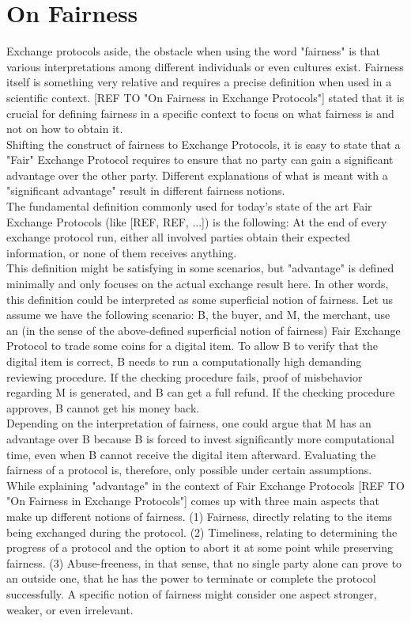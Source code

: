 \documentclass{cacthesis}
\begin{document}
		\section{On Fairness}
		Exchange protocols aside, the obstacle when using the word "fairness" is that various interpretations among different individuals or even cultures exist. Fairness itself is something very relative and requires a precise definition when used in a scientific context. [REF TO "On Fairness in Exchange Protocols"] stated that it is crucial for defining fairness in a specific context to focus on what fairness is and not on how to obtain it. \\
        Shifting the construct of fairness to Exchange Protocols, it is easy to state that a "Fair" Exchange Protocol requires to ensure that no party can gain a significant advantage over the other party. Different explanations of what is meant with a "significant advantage" result in different fairness notions. \\
        The fundamental definition commonly used for today's state of the art Fair Exchange Protocols (like [REF, REF, ...]) is the following: At the end of every exchange protocol run, either all involved parties obtain their expected information, or none of them receives anything. \\
        This definition might be satisfying in some scenarios, but "advantage" is defined minimally and only focuses on the actual exchange result here. In other words, this definition could be interpreted as some superficial notion of fairness. Let us assume we have the following scenario: B, the buyer, and M, the merchant, use an (in the sense of the above-defined superficial notion of fairness) Fair Exchange Protocol to trade some coins for a digital item. To allow B to verify that the digital item is correct, B needs to run a computationally high demanding reviewing procedure. If the checking procedure fails, proof of misbehavior regarding M is generated, and B can get a full refund. If the checking procedure approves, B cannot get his money back. \\
        Depending on the interpretation of fairness, one could argue that M has an advantage over B because B is forced to invest significantly more computational time, even when B cannot receive the digital item afterward. Evaluating the fairness of a protocol is, therefore, only possible under certain assumptions. \\
        While explaining "advantage" in the context of Fair Exchange Protocols [REF TO "On Fairness in Exchange Protocols"] comes up with three main aspects that make up different notions of fairness. (1) Fairness, directly relating to the items being exchanged during the protocol. (2) Timeliness, relating to determining the progress of a protocol and the option to abort it at some point while preserving fairness. (3) Abuse-freeness, in that sense, that no single party alone can prove to an outside one, that he has the power to terminate or complete the protocol successfully. A specific notion of fairness might consider one aspect stronger, weaker, or even irrelevant. \\
\end{document}
